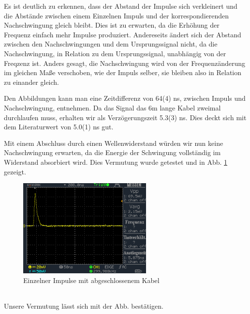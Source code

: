 \documentclass[a4paper,10pt]{article}
\numberwithin{equation}{section}
\begin{document}
Es ist deutlich zu erkennen, dass der Abstand der Impulse sich verkleinert und die Abstände zwischen einem Einzelnen Impuls und der korrespondierenden Nachschwingung gleich bleibt. Dies ist zu erwarten, da die Erhöhung der Frequenz einfach mehr Impulse produziert. Andereseits ändert sich der Abstand zwischen den Nachschwingungen und dem Ursprungssignal nicht, da die Nachschwingung, in Relation zu dem Ursprungssignal, unabhängig von der Freqzenz ist. Anders gesagt, die Nachschwingung wird von der Frequenzänderung im gleichen Maße verschoben, wie der Impuls selber, sie bleiben also in Relation zu einander gleich.

Den Abbildungen kann man eine Zeitdifferenz von 64(4) ns, zwischen Impuls und Nachschwingung, entnehmen. Da das Signal das 6m lange Kabel zweimal durchlaufen muss, erhalten wir als Verzögerungszeit 5.3(3) ns. Dies deckt sich mit dem Literaturwert von 5.0(1) ns gut.

Mit einem Abschluss durch einen Wellenwiderstand würden wir nun keine Nachschwingung erwarten, da die Energie der Schwingung vollständig im Widerstand absorbiert wird. Dies Vermutung wurde getestet und in Abb. \ref{fig:3.10} gezeigt.
\begin{figure}[h]
        \centering
        \includegraphics[width=0.6\textwidth]{data/DS0026.BMP.png}
        \caption{Einzelner Impulse mit abgeschlossenem Kabel}
		\label{fig:3.10}
\end{figure}\\
Unsere Vermutung lässt sich mit der Abb. bestätigen.

\clearpage
\end{document}
